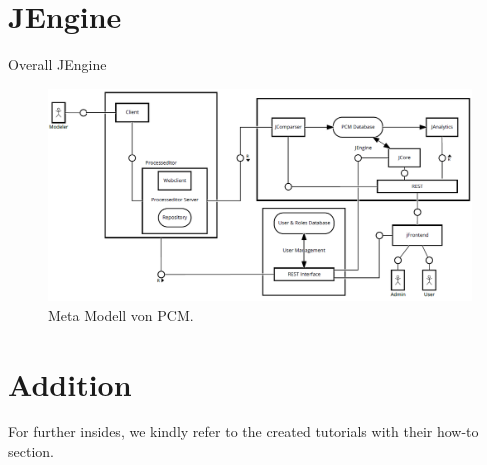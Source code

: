 \documentclass{article}
\begin{document}
%
%
\section{JEngine}
Overall JEngine

\begin{figure}
\centering
\includegraphics[width=6in]{img/fmc-architecture-v2_4.png}
\caption{Meta Modell von PCM.}
\label{fig:PCMmetaModell}
\end{figure}



\newpage

%

%

%



\newpage

%

%

\section{Addition}
For further insides, we kindly refer to the created tutorials with their how-to section. 


%

%

\end{document}

